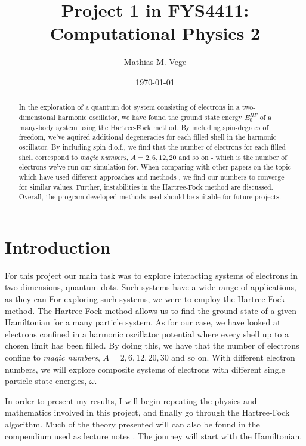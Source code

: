 \documentclass[11pt]{article}
\title{Project 1 in FYS4411: Computational Physics 2}
\author{Mathias M. Vege}
\date{\today}
\begin{document}
\maketitle

\begin{abstract}
In the exploration of a quantum dot system consisting of electrons in a two-dimensional harmonic oscillator, we have found the ground state energy $E^{HF}_0$ of a many-body system using the Hartree-Fock method. By including spin-degrees of freedom, we've aquired additional degeneracies for each filled shell in the harmonic oscillator. By including spin d.o.f., we find that the number of electrons for each filled shell correspond to \textit{magic numbers}, $A = 2, 6, 12, 20$ and so on - which is the number of electrons we've run our simulation for. When comparing with other papers on the topic which have used different approaches and methods \cite{PhysRevB.84.115302}, we find our numbers to converge for similar values. Further, instabilities in the Hartree-Fock method are discussed. Overall, the program developed \cite{github} methods used should be suitable for future projects.
\end{abstract}

\section{Introduction}
For this project our main task was to explore interacting systems of electrons in two dimensions, quantum dots. Such systems have a wide range of applications, as they can  For exploring such systems, we were to employ the Hartree-Fock method. The Hartree-Fock method allows us to find the ground state of a given Hamiltonian for a many particle system. As for our case, we have looked at electrons confined in a harmonic oscillator potential where every shell up to a chosen limit has been filled. By doing this, we have that the number of electrons confine to \textit{magic numbers}, $A = 2, 6, 12, 20, 30$ and so on. With different electron numbers, we will explore composite systems of electrons with different single particle state energies, $\omega$.

In order to present my results, I will begin repeating the physics and mathematics involved in this project, and finally go through the Hartree-Fock algorithm. Much of the theory presented will can also be found in the compendium used as lecture notes \cite{komp2015}. The journey will start with the Hamiltonian.
\end{document}
